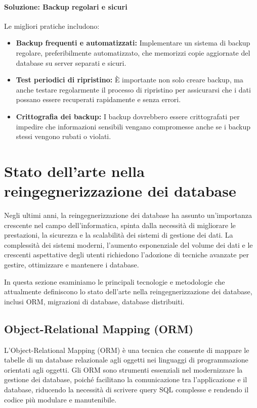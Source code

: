 \paragraph{Soluzione: Backup regolari e sicuri}
Le migliori pratiche includono:
\begin{itemize}
    \item \textbf{Backup frequenti e automatizzati:} Implementare un sistema di backup regolare, preferibilmente automatizzato, che memorizzi copie aggiornate del database su server separati e sicuri.
    \item \textbf{Test periodici di ripristino:} È importante non solo creare backup, ma anche testare regolarmente il processo di ripristino per assicurarsi che i dati possano essere recuperati rapidamente e senza errori.
    \item \textbf{Crittografia dei backup:} I backup dovrebbero essere crittografati per impedire che informazioni sensibili vengano compromesse anche se i backup stessi vengono rubati o violati.
\end{itemize}
\section{Stato dell’arte nella reingegnerizzazione dei database}
Negli ultimi anni, la reingegnerizzazione dei database ha assunto un'importanza crescente nel campo dell'informatica, spinta dalla necessità di migliorare le prestazioni, la sicurezza e la scalabilità dei sistemi di gestione dei dati. La complessità dei sistemi moderni, l'aumento esponenziale del volume dei dati e le crescenti aspettative degli utenti richiedono l'adozione di tecniche avanzate per gestire, ottimizzare e mantenere i database.

In questa sezione esaminiamo le principali tecnologie e metodologie che attualmente definiscono lo stato dell'arte nella reingegnerizzazione dei database, inclusi ORM, migrazioni di database, database distribuiti.

\subsection{Object-Relational Mapping (ORM)}
L'Object-Relational Mapping (ORM) è una tecnica che consente di mappare le tabelle di un database relazionale agli oggetti nei linguaggi di programmazione orientati agli oggetti. Gli ORM sono strumenti essenziali nel modernizzare la gestione dei database, poiché facilitano la comunicazione tra l'applicazione e il database, riducendo la necessità di scrivere query SQL complesse e rendendo il codice più modulare e manutenibile.

